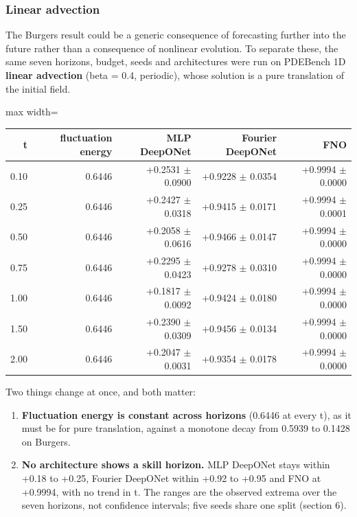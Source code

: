\documentclass[preprint,12pt]{elsarticle}
\begin{document}
\subsubsection{Linear advection}

The Burgers result could be a generic consequence of forecasting further into the future rather than a consequence of nonlinear evolution. To separate these, the same seven horizons, budget, seeds and architectures were run on PDEBench 1D \textbf{linear advection} (beta = 0.4, periodic), whose solution is a pure translation of the initial field.

\begin{center}
\begin{adjustbox}{max width=\linewidth}
\small
\begin{tabular}{rrrrr}
\toprule
t & fluctuation energy & MLP DeepONet & Fourier DeepONet & FNO \\
\midrule
0.10 & 0.6446 & +0.2531 $\pm$ 0.0900 & +0.9228 $\pm$ 0.0354 & +0.9994 $\pm$ 0.0000 \\
0.25 & 0.6446 & +0.2427 $\pm$ 0.0318 & +0.9415 $\pm$ 0.0171 & +0.9994 $\pm$ 0.0001 \\
0.50 & 0.6446 & +0.2058 $\pm$ 0.0616 & +0.9466 $\pm$ 0.0147 & +0.9994 $\pm$ 0.0000 \\
0.75 & 0.6446 & +0.2295 $\pm$ 0.0423 & +0.9278 $\pm$ 0.0310 & +0.9994 $\pm$ 0.0000 \\
1.00 & 0.6446 & +0.1817 $\pm$ 0.0092 & +0.9424 $\pm$ 0.0180 & +0.9994 $\pm$ 0.0000 \\
1.50 & 0.6446 & +0.2390 $\pm$ 0.0309 & +0.9456 $\pm$ 0.0134 & +0.9994 $\pm$ 0.0000 \\
2.00 & 0.6446 & +0.2047 $\pm$ 0.0031 & +0.9354 $\pm$ 0.0178 & +0.9994 $\pm$ 0.0000 \\
\bottomrule
\end{tabular}
\end{adjustbox}
\end{center}


Two things change at once, and both matter:

\begin{enumerate}
\item \textbf{Fluctuation energy is constant across horizons} (0.6446 at every t), as it must be for pure translation, against a monotone decay from 0.5939 to 0.1428 on Burgers.
\item \textbf{No architecture shows a skill horizon.} MLP DeepONet stays within +0.18 to +0.25, Fourier DeepONet within +0.92 to +0.95 and FNO at +0.9994, with no trend in t. The ranges are the observed extrema over the seven horizons, not confidence intervals; five seeds share one split (section 6).
\end{enumerate}
\end{document}
